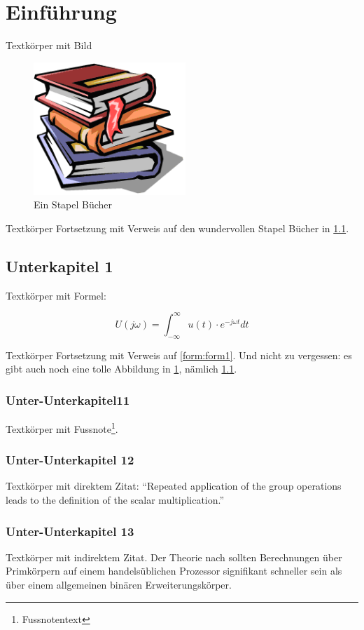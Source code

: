\chapter{Einführung}
\label{chap:intro}

Textkörper mit Bild

\begin{figure}[htbp]
	\centering
		\includegraphics[height=5cm]{figures/buecher}
	\caption{Ein Stapel Bücher}
	\label{fig:buecher}
\end{figure}


Textkörper Fortsetzung mit Verweis auf den wundervollen Stapel Bücher in
\cref{fig:buecher}. 


\section{Unterkapitel 1}
\label{sec:Unterkapitel1}

Textkörper mit Formel:

\begin{equation}
U(j\omega)=\int^{\infty}_{-\infty}{u(t) \cdot e^{-j\omega t}dt}
\label{form:form1}
\end{equation}

Textkörper Fortsetzung mit Verweis auf \cref{form:form1}. Und nicht zu vergessen: es gibt auch noch eine tolle Abbildung in \cref{chap:intro}, nämlich \cref{fig:buecher}. 

\subsection{Unter-Unterkapitel11}
\label{sec:UnterUnterkapitel11}

Textkörper mit Fussnote\footnote{Fussnotentext}.

\subsection{Unter-Unterkapitel 12}
\label{sec:UnterUnterkapitel12}

Textkörper mit direktem Zitat:
``Repeated application of the group operations leads to the definition of the scalar multiplication.'' \cite{Koschuch2006}

\subsection{Unter-Unterkapitel 13}
\label{sec:UnterUnterkapitel13}

Textkörper mit indirektem Zitat.
Der Theorie nach sollten Berechnungen über Primkörpern auf einem handelsüblichen Prozessor signifikant schneller sein als über einem allgemeinen binären Erweiterungskörper. \cite{Hankerson2004}
